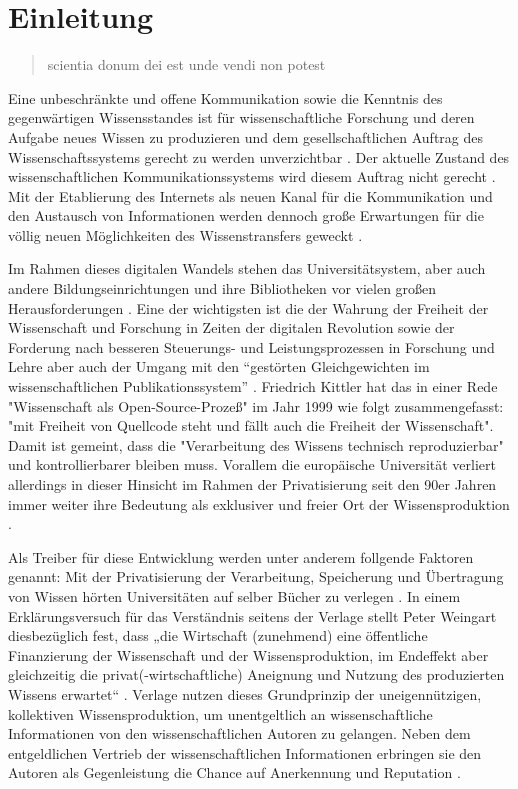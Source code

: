\chapter{Einleitung} 

\begin{quote}
scientia donum dei est unde vendi non potest
\end{quote}Eine unbeschränkte und offene Kommunikation sowie die Kenntnis des gegenwärtigen Wissensstandes ist für wissenschaftliche Forschung und deren Aufgabe neues Wissen zu produzieren und dem gesellschaftlichen Auftrag des Wissenschaftssystems gerecht zu werden unverzichtbar \cite{Hanekop_2014} \cite{glaeser2006} \cite{gibbons_1994} \cite{Luhmann1998}. Der aktuelle Zustand des wissenschaftlichen Kommunikationssystems wird diesem Auftrag nicht gerecht \cite{suchen}. Mit der Etablierung des Internets als neuen Kanal für die Kommunikation und den Austausch von Informationen werden dennoch große Erwartungen für die völlig neuen Möglichkeiten des Wissenstransfers geweckt \cite{Hanekop_2014} \cite{schulze_2013_open} \cite{albert_2006_open_implications} \cite{Goodrum_2001} \cite{Lawrence_1999}. 

Im Rahmen dieses digitalen Wandels stehen das Universitätsystem, aber auch andere Bildungseinrichtungen und ihre Bibliotheken vor vielen großen Herausforderungen \cite{Harter2006} \cite{Gu_don_2004} \cite{osterloh2008anreize}. Eine der wichtigsten ist die der Wahrung der Freiheit der Wissenschaft und Forschung in Zeiten der digitalen Revolution sowie der Forderung nach besseren Steuerungs- und Leistungsprozessen in Forschung und Lehre \cite{Adler_2009} \cite{gibbons_1994} aber auch der Umgang mit den “gestörten Gleichgewichten im wissenschaftlichen Publikationssystem” \cite{cite:0}. Friedrich Kittler hat das in einer Rede "Wissenschaft als Open-Source-Prozeß" im Jahr 1999 wie folgt zusammengefasst: "mit Freiheit von Quellcode steht und fällt auch die Freiheit der Wissenschaft". Damit ist gemeint, dass die "Verarbeitung des Wissens technisch reproduzierbar" \cite{cite:1} und kontrollierbarer bleiben muss. Vorallem die europäische Universität verliert allerdings in dieser Hinsicht im Rahmen der Privatisierung seit den 90er Jahren immer weiter ihre Bedeutung als exklusiver und freier Ort der Wissensproduktion \cite{suchen}.

Als Treiber für diese Entwicklung werden unter anderem follgende Faktoren genannt: Mit der Privatisierung der Verarbeitung, Speicherung und Übertragung von Wissen hörten Universitäten auf selber Bücher zu verlegen \cite{cite:0}. In einem Erklärungsversuch für das Verständnis seitens der Verlage stellt Peter Weingart diesbezüglich fest, dass „die Wirtschaft (zunehmend) eine öffentliche Finanzierung der Wissenschaft und der Wissensproduktion, im Endeffekt aber gleichzeitig die privat(-wirtschaftliche) Aneignung und Nutzung des produzierten Wissens erwartet“ \cite{cite:2}. Verlage nutzen dieses Grundprinzip der uneigennützigen, kollektiven Wissensproduktion, um unentgeltlich an wissenschaftliche Informationen von den wissenschaftlichen Autoren zu gelangen. Neben dem entgeldlichen Vertrieb der wissenschaftlichen Informationen erbringen sie den Autoren als Gegenleistung die Chance auf Anerkennung und Reputation \cite{cite:21a}. 

